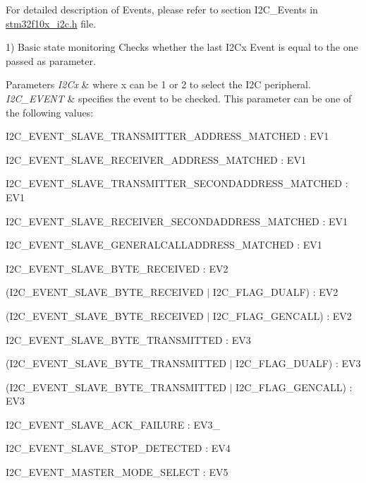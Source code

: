 For detailed description of Events, please refer to section I2\+C\+\_\+\+Events in \hyperlink{stm32f10x__i2c_8h}{stm32f10x\+\_\+i2c.\+h} file.

1) Basic state monitoring Checks whether the last I2\+Cx Event is equal to the one passed as parameter. 
\begin{DoxyParams}{Parameters}
{\em I2\+Cx} & where x can be 1 or 2 to select the I2C peripheral. \\
\hline
{\em I2\+C\+\_\+\+E\+V\+E\+NT} & specifies the event to be checked. This parameter can be one of the following values\+: \begin{DoxyItemize}
\item I2\+C\+\_\+\+E\+V\+E\+N\+T\+\_\+\+S\+L\+A\+V\+E\+\_\+\+T\+R\+A\+N\+S\+M\+I\+T\+T\+E\+R\+\_\+\+A\+D\+D\+R\+E\+S\+S\+\_\+\+M\+A\+T\+C\+H\+ED \+: E\+V1 \item I2\+C\+\_\+\+E\+V\+E\+N\+T\+\_\+\+S\+L\+A\+V\+E\+\_\+\+R\+E\+C\+E\+I\+V\+E\+R\+\_\+\+A\+D\+D\+R\+E\+S\+S\+\_\+\+M\+A\+T\+C\+H\+ED \+: E\+V1 \item I2\+C\+\_\+\+E\+V\+E\+N\+T\+\_\+\+S\+L\+A\+V\+E\+\_\+\+T\+R\+A\+N\+S\+M\+I\+T\+T\+E\+R\+\_\+\+S\+E\+C\+O\+N\+D\+A\+D\+D\+R\+E\+S\+S\+\_\+\+M\+A\+T\+C\+H\+ED \+: E\+V1 \item I2\+C\+\_\+\+E\+V\+E\+N\+T\+\_\+\+S\+L\+A\+V\+E\+\_\+\+R\+E\+C\+E\+I\+V\+E\+R\+\_\+\+S\+E\+C\+O\+N\+D\+A\+D\+D\+R\+E\+S\+S\+\_\+\+M\+A\+T\+C\+H\+ED \+: E\+V1 \item I2\+C\+\_\+\+E\+V\+E\+N\+T\+\_\+\+S\+L\+A\+V\+E\+\_\+\+G\+E\+N\+E\+R\+A\+L\+C\+A\+L\+L\+A\+D\+D\+R\+E\+S\+S\+\_\+\+M\+A\+T\+C\+H\+ED \+: E\+V1 \item I2\+C\+\_\+\+E\+V\+E\+N\+T\+\_\+\+S\+L\+A\+V\+E\+\_\+\+B\+Y\+T\+E\+\_\+\+R\+E\+C\+E\+I\+V\+ED \+: E\+V2 \item (I2\+C\+\_\+\+E\+V\+E\+N\+T\+\_\+\+S\+L\+A\+V\+E\+\_\+\+B\+Y\+T\+E\+\_\+\+R\+E\+C\+E\+I\+V\+ED $\vert$ I2\+C\+\_\+\+F\+L\+A\+G\+\_\+\+D\+U\+A\+LF) \+: E\+V2 \item (I2\+C\+\_\+\+E\+V\+E\+N\+T\+\_\+\+S\+L\+A\+V\+E\+\_\+\+B\+Y\+T\+E\+\_\+\+R\+E\+C\+E\+I\+V\+ED $\vert$ I2\+C\+\_\+\+F\+L\+A\+G\+\_\+\+G\+E\+N\+C\+A\+LL) \+: E\+V2 \item I2\+C\+\_\+\+E\+V\+E\+N\+T\+\_\+\+S\+L\+A\+V\+E\+\_\+\+B\+Y\+T\+E\+\_\+\+T\+R\+A\+N\+S\+M\+I\+T\+T\+ED \+: E\+V3 \item (I2\+C\+\_\+\+E\+V\+E\+N\+T\+\_\+\+S\+L\+A\+V\+E\+\_\+\+B\+Y\+T\+E\+\_\+\+T\+R\+A\+N\+S\+M\+I\+T\+T\+ED $\vert$ I2\+C\+\_\+\+F\+L\+A\+G\+\_\+\+D\+U\+A\+LF) \+: E\+V3 \item (I2\+C\+\_\+\+E\+V\+E\+N\+T\+\_\+\+S\+L\+A\+V\+E\+\_\+\+B\+Y\+T\+E\+\_\+\+T\+R\+A\+N\+S\+M\+I\+T\+T\+ED $\vert$ I2\+C\+\_\+\+F\+L\+A\+G\+\_\+\+G\+E\+N\+C\+A\+LL) \+: E\+V3 \item I2\+C\+\_\+\+E\+V\+E\+N\+T\+\_\+\+S\+L\+A\+V\+E\+\_\+\+A\+C\+K\+\_\+\+F\+A\+I\+L\+U\+RE \+: E\+V3\+\_ \item I2\+C\+\_\+\+E\+V\+E\+N\+T\+\_\+\+S\+L\+A\+V\+E\+\_\+\+S\+T\+O\+P\+\_\+\+D\+E\+T\+E\+C\+T\+ED \+: E\+V4 \item I2\+C\+\_\+\+E\+V\+E\+N\+T\+\_\+\+M\+A\+S\+T\+E\+R\+\_\+\+M\+O\+D\+E\+\_\+\+S\+E\+L\+E\+CT \+: E\+V5 \item 
\end{DoxyItemize}
\end{DoxyParams}
